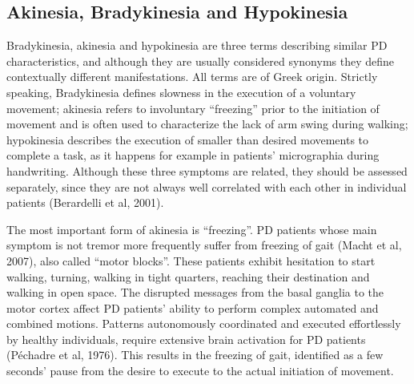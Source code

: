\subsection{Akinesia, Bradykinesia and Hypokinesia}
\label{subsec:akinesia}
Bradykinesia, akinesia and hypokinesia are three terms describing similar \gls{PD} characteristics, and although they are usually considered synonyms they define contextually different manifestations. All terms are of Greek origin. Strictly speaking, Bradykinesia defines slowness in the execution of a voluntary movement; akinesia refers to involuntary ``freezing'' prior to the initiation of movement and is often used to characterize the lack of arm swing during walking; hypokinesia describes the execution of smaller than desired movements to complete a task, as it happens for example in patients' micrographia during handwriting. Although these three symptoms are related, they should be assessed separately, since they are not always well correlated with each other in individual patients (Berardelli et al, 2001).

The most important form of akinesia is ``freezing''. \gls{PD} patients whose main symptom is not tremor more frequently suffer from freezing of gait (Macht et al, 2007), also called ``motor blocks''. These patients exhibit hesitation to start walking, turning, walking in tight quarters, reaching their destination and walking in open space. The disrupted messages from the basal ganglia to the motor cortex affect \gls{PD} patients' ability to perform complex automated and combined motions. Patterns autonomously coordinated and executed effortlessly by healthy individuals, require extensive brain activation for \gls{PD} patients (Péchadre et al, 1976). This results in the freezing of gait, identified as a few seconds' pause from the desire to execute to the actual initiation of movement.

